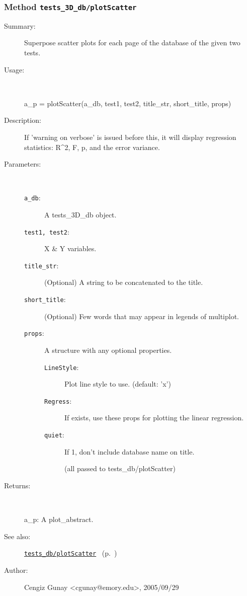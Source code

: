 \subsubsection[Method \texttt{plotScatter}]{Method \texttt{tests\_3D\_db/plotScatter}}%
%
\label{ref_tests_3D_db__plotScatter}%
\hypertarget{ref_tests_3D_db__plotScatter}{}%
\begin{description}
\item[Summary:]Superpose scatter plots for each page of the database of the given two tests.
%
\item[Usage:]~%
\begin{lyxcode}%
a\_p = plotScatter(a\_db, test1, test2, title\_str, short\_title, props)
%
\end{lyxcode}%
%
\item[Description:]%
If 'warning on verbose' is issued before this, it will display
 regression statistics: R\textasciicircum{}2, F, p, and the error variance.
\item[Parameters:]~
\begin{description}%
\item[\texttt{a\_db}:]
 A tests\_3D\_db object.
\item[\texttt{test1, test2}:]
 X \& Y variables.
\item[\texttt{title\_str}:]
 (Optional) A string to be concatenated to the title.
\item[\texttt{short\_title}:]
 (Optional) Few words that may appear in legends of multiplot.
\item[\texttt{props}:]
 A structure with any optional properties.
\begin{description}%
\item[\texttt{LineStyle}:]
 Plot line style to use. (default: 'x')
\item[\texttt{Regress}:]
 If exists, use these props for plotting the linear regression.
\item[\texttt{quiet}:]
 If 1, don't include database name on title.

(all passed to tests\_db/plotScatter)
\end{description}%
\end{description}%
%
\item[Returns:
]~

	a\_p: A plot\_abstract.
%
%
\item[See also:]%
\hyperlink{ref_tests_db__plotScatter}{\texttt{tests\_db/plotScatter}}%
\ (p.~\pageref{ref_tests_db__plotScatter})%
%
%
\item[Author:]%
Cengiz Gunay <cgunay@emory.edu>, 2005/09/29
%
\end{description}
\methodline%
